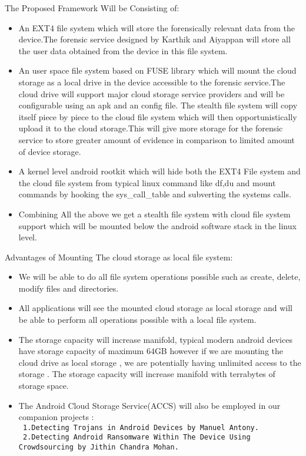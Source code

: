 The Proposed Framework Will be Consisting of:\\
\begin{itemize}
\item An EXT4 file system which will store the forensically relevant data from the device.The forensic service designed by  Karthik \cite{Karthik2016} and Aiyappan \cite{Aiyyappan2015} will store all the user data obtained from the device in this file system.

\item An user space file system based on FUSE library which will mount the cloud storage as a local drive in the device accessible to the forensic service.The cloud drive will support major cloud storage service providers and will be configurable using an apk and an config file. The stealth file system will copy itself piece by piece to the cloud file system which will then opportunistically upload it to the cloud storage.This will give more storage for the forensic service to store greater amount of evidence in comparison to limited amount of device storage.

\item A kernel level android rootkit which will hide both the EXT4 File system and the cloud file system from typical linux command like df,du and mount commands by hooking the sys\_call\_table and subverting the systems calls.

\item Combining All the above we get a stealth file system with cloud file system support which will be mounted below the android software stack in the linux level.
 
\end{itemize}
\bigskip

Advantages of Mounting The cloud storage as local file system:
\begin{itemize}
\item We will be able to do all file system operations possible such as create, delete, modify files and directories.
\item All applications will see the mounted cloud storage as local storage and will be able to perform all operations possible with a local file system.
\item The storage capacity will increase manifold, typical modern android devices have storage capacity of maximum 64GB however if we are mounting the cloud drive as local storage , we are potentially having unlimited access to the storage . The storage capacity will increase manifold with terrabytes of storage space.
\item The Android Cloud Storage Service(ACCS) will also be employed in our companion projects :\\
\tt 
1.Detecting Trojans in Android Devices by Manuel Antony.\\
\tt 
2.Detecting  Android Ransomware Within The
Device Using Crowdsourcing by Jithin Chandra Mohan.
\end{itemize}

